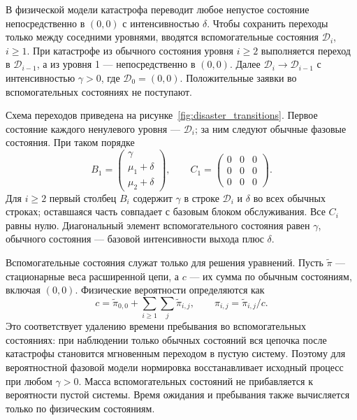\documentclass[a4paper,12pt]{article}
\begin{document}
В физической модели катастрофа переводит любое непустое состояние непосредственно в \((0,0)\) с интенсивностью \(\delta\). Чтобы сохранить переходы только между соседними уровнями, вводятся вспомогательные состояния \(\mathcal{D}_i\), \(i\ge1\). При катастрофе из обычного состояния уровня \(i\ge2\) выполняется переход в \(\mathcal{D}_{i-1}\), а из уровня 1 --- непосредственно в \((0,0)\). Далее \(\mathcal{D}_i\to \mathcal{D}_{i-1}\) с интенсивностью \(\gamma>0\), где \(\mathcal{D}_0=(0,0)\). Положительные заявки во вспомогательных состояниях не поступают.

Схема переходов приведена на рисунке~\ref{fig:disaster_transitions}. Первое состояние каждого ненулевого уровня --- \(\mathcal{D}_i\); за ним следуют обычные фазовые состояния. При таком порядке
\[
B_1=\begin{pmatrix}\gamma\\\mu_1+\delta\\\mu_2+\delta\end{pmatrix},\qquad
C_1=\begin{pmatrix}0&0&0\\0&0&0\\0&0&0\end{pmatrix}.
\]
Для \(i\ge2\) первый столбец \(B_i\) содержит \(\gamma\) в строке \(\mathcal{D}_i\) и \(\delta\) во всех обычных строках; оставшаяся часть совпадает с базовым блоком обслуживания. Все \(C_i\) равны нулю. Диагональный элемент вспомогательного состояния равен \(\gamma\), обычного состояния --- базовой интенсивности выхода плюс \(\delta\).

Вспомогательные состояния служат только для решения уравнений. Пусть \(\widetilde\pi\) --- стационарные веса расширенной цепи, а \(c\) --- их сумма по обычным состояниям, включая \((0,0)\). Физические вероятности определяются как
\[
c=\widetilde\pi_{0,0}+\sum_{i\ge1}\sum_j\widetilde\pi_{i,j},\qquad
\pi_{i,j}=\widetilde\pi_{i,j}/c.
\]
Это соответствует удалению времени пребывания во вспомогательных состояниях: при наблюдении только обычных состояний вся цепочка после катастрофы становится мгновенным переходом в пустую систему. Поэтому для вероятностной фазовой модели нормировка восстанавливает исходный процесс при любом \(\gamma>0\). Масса вспомогательных состояний не прибавляется к вероятности пустой системы. Время ожидания и пребывания также вычисляется только по физическим состояниям. 
\end{document}
